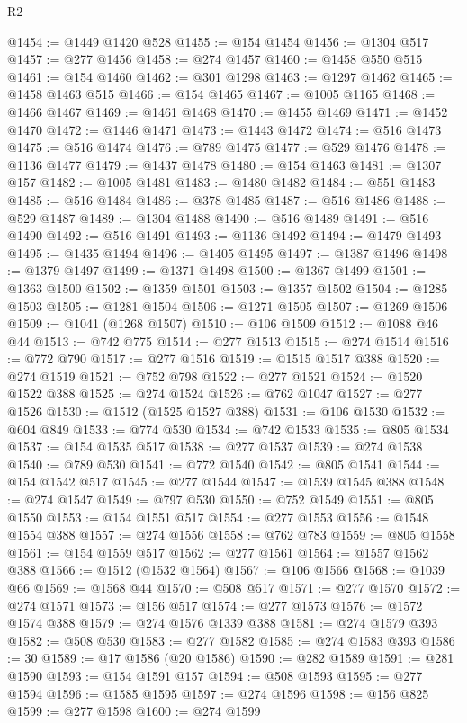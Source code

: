 \begin{lexlean}{R2}
\begin{coremodule}
@1454 := @1449 @1420 @528
@1455 := @154 @1454
@1456 := @1304 @517
@1457 := @277 @1456
@1458 := @274 @1457
@1460 := @1458 @550 @515
@1461 := @154 @1460
@1462 := @301 @1298
@1463 := @1297 @1462
@1465 := @1458 @1463 @515
@1466 := @154 @1465
@1467 := @1005 @1165
@1468 := @1466 @1467
@1469 := @1461 @1468
@1470 := @1455 @1469
@1471 := @1452 @1470
@1472 := @1446 @1471
@1473 := @1443 @1472
@1474 := @516 @1473
@1475 := @516 @1474
@1476 := @789 @1475
@1477 := @529 @1476
@1478 := @1136 @1477
@1479 := @1437 @1478
@1480 := @154 @1463
@1481 := @1307 @157
@1482 := @1005 @1481
@1483 := @1480 @1482
@1484 := @551 @1483
@1485 := @516 @1484
@1486 := @378 @1485
@1487 := @516 @1486
@1488 := @529 @1487
@1489 := @1304 @1488
@1490 := @516 @1489
@1491 := @516 @1490
@1492 := @516 @1491
@1493 := @1136 @1492
@1494 := @1479 @1493
@1495 := @1435 @1494
@1496 := @1405 @1495
@1497 := @1387 @1496
@1498 := @1379 @1497
@1499 := @1371 @1498
@1500 := @1367 @1499
@1501 := @1363 @1500
@1502 := @1359 @1501
@1503 := @1357 @1502
@1504 := @1285 @1503
@1505 := @1281 @1504
@1506 := @1271 @1505
@1507 := @1269 @1506
@1509 := @1041 (@1268 @1507)
@1510 := @106 @1509
@1512 := @1088 @46 @44
@1513 := @742 @775
@1514 := @277 @1513
@1515 := @274 @1514
@1516 := @772 @790
@1517 := @277 @1516
@1519 := @1515 @1517 @388
@1520 := @274 @1519
@1521 := @752 @798
@1522 := @277 @1521
@1524 := @1520 @1522 @388
@1525 := @274 @1524
@1526 := @762 @1047
@1527 := @277 @1526
@1530 := @1512 (@1525 @1527 @388)
@1531 := @106 @1530
@1532 := @604 @849
@1533 := @774 @530
@1534 := @742 @1533
@1535 := @805 @1534
@1537 := @154 @1535 @517
@1538 := @277 @1537
@1539 := @274 @1538
@1540 := @789 @530
@1541 := @772 @1540
@1542 := @805 @1541
@1544 := @154 @1542 @517
@1545 := @277 @1544
@1547 := @1539 @1545 @388
@1548 := @274 @1547
@1549 := @797 @530
@1550 := @752 @1549
@1551 := @805 @1550
@1553 := @154 @1551 @517
@1554 := @277 @1553
@1556 := @1548 @1554 @388
@1557 := @274 @1556
@1558 := @762 @783
@1559 := @805 @1558
@1561 := @154 @1559 @517
@1562 := @277 @1561
@1564 := @1557 @1562 @388
@1566 := @1512 (@1532 @1564)
@1567 := @106 @1566
@1568 := @1039 @66
@1569 := @1568 @44
@1570 := @508 @517
@1571 := @277 @1570
@1572 := @274 @1571
@1573 := @156 @517
@1574 := @277 @1573
@1576 := @1572 @1574 @388
@1579 := @274 @1576 @1339 @388
@1581 := @274 @1579 @393
@1582 := @508 @530
@1583 := @277 @1582
@1585 := @274 @1583 @393
@1586 := 30
@1589 := @17 @1586 (@20 @1586)
@1590 := @282 @1589
@1591 := @281 @1590
@1593 := @154 @1591 @157
@1594 := @508 @1593
@1595 := @277 @1594
@1596 := @1585 @1595
@1597 := @274 @1596
@1598 := @156 @825
@1599 := @277 @1598
@1600 := @274 @1599

\end{coremodule}
\end{lexlean}
